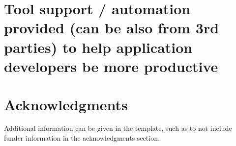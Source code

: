 \documentclass[fleqn,10pt]{olplainarticle}
\begin{document}
\section*{Tool support / automation provided (can be also from 3rd parties) to help application developers be more productive}

\section*{Acknowledgments}

Additional information can be given in the template, such as to not include funder information in the acknowledgments section.


\end{document}
